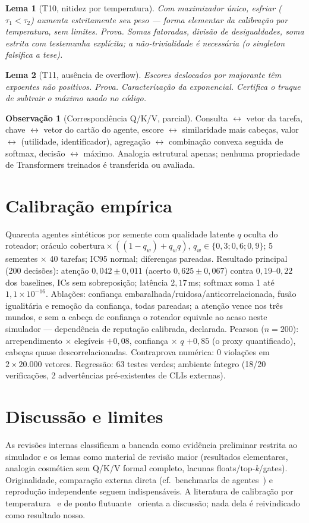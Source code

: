 \documentclass[11pt,a4paper]{article}
\newtheorem{lemma}{Lema}
\theoremstyle{definition}
\newtheorem{remark}{Observação}
\begin{document}
\begin{lemma}[T10, nitidez por temperatura]
Com maximizador único, esfriar ($\tau_1<\tau_2$) aumenta estritamente seu peso --- forma elementar da calibração por temperatura, sem limites.
\textit{Prova.} Somas fatoradas, divisão de desigualdades, soma estrita com testemunha explícita; a não-trivialidade é necessária (o singleton falsifica a tese). \end{lemma}
\begin{lemma}[T11, ausência de overflow]
Escores deslocados por majorante têm expoentes não positivos.
\textit{Prova.} Caracterização da exponencial. Certifica o truque de subtrair o máximo usado no código. \end{lemma}
\begin{remark}[Correspondência Q/K/V, parcial]
Consulta $\leftrightarrow$ vetor da tarefa, chave $\leftrightarrow$ vetor do cartão do agente, escore $\leftrightarrow$ similaridade mais cabeças, valor $\leftrightarrow$ (utilidade, identificador), agregação $\leftrightarrow$ combinação convexa seguida de softmax, decisão $\leftrightarrow$ máximo. Analogia estrutural apenas; nenhuma propriedade de Transformers treinados é transferida ou avaliada. \end{remark}
\section{Calibração empírica}
Quarenta agentes sintéticos por semente com qualidade latente $q$ oculta do roteador; oráculo $\text{cobertura}\times((1-q_w)+q_wq)$, $q_w\in\{0{,}3;0{,}6;0{,}9\}$; 5 sementes $\times$ 40 tarefas; IC95 normal; diferenças pareadas. Resultado principal (200 decisões): atenção $0{,}042\pm0{,}011$ (acerto $0{,}625\pm0{,}067$) contra $0{,}19$--$0{,}22$ dos baselines, ICs sem sobreposição; latência $2{,}17$\,ms; softmax soma 1 até $1{,}1\times10^{-16}$. Ablações: confiança embaralhada/ruidosa/anticorrelacionada, fusão igualitária e remoção da confiança, todas pareadas; a atenção vence nos três mundos, e sem a cabeça de confiança o roteador equivale ao acaso neste simulador --- dependência de reputação calibrada, declarada. Pearson ($n=200$): arrependimento $\times$ elegíveis $+0{,}08$, confiança $\times$ $q$ $+0{,}85$ (o proxy quantificado), cabeças quase descorrelacionadas. Contraprova numérica: 0 violações em $2\times20{.}000$ vetores. Regressão: 63 testes verdes; ambiente íntegro (18/20 verificações, 2 advertências pré-existentes de CLIs externas).
\section{Discussão e limites}
As revisões internas classificam a bancada como evidência preliminar restrita ao simulador e os lemas como material de revisão maior (resultados elementares, analogia cosmética sem Q/K/V formal completo, lacunas floats/top-\textit{k}/gates). Originalidade, comparação externa direta (cf.\ benchmarks de agentes~\cite{agentbench2023,perspectivegap2026,orchrm2026,orchestrator2025}) e reprodução independente seguem indispensáveis. A literatura de calibração por temperatura~\cite{xuan2025,komisarenko2024,xie2024} e de ponto flutuante~\cite{bagnara2019,murray2026} orienta a discussão; nada dela é reivindicado como resultado nosso.
\end{document}
